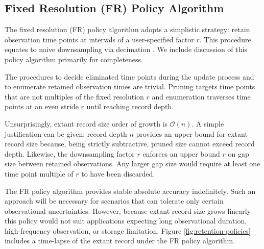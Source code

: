\subsection{Fixed Resolution (FR) Policy Algorithm}
\label{sec:fixed-resolution-algo}

The fixed resolution (FR) policy algorithm adopts a simplistic strategy: retain observation time points at intervals of a user-specified factor $r$.
This procedure equates to naive downsampling via decimation \citep[p. 31]{crochiere1983multirate}.
We include discussion of this policy algorithm primarily for completeness.

The procedures to decide eliminated time points during the update process and to enumerate retained observation times are trivial.
Pruning targets time points that are not multiples of the fixed resolution $r$ and enumeration traverses time points at an even stride $r$ until reaching record depth.

Unsurprisingly, extant record size order of growth is $\mathcal{O}(n)$.
A simple justification can be given: record depth $n$ provides an upper bound for extant record size because, being strictly subtractive, pruned size cannot exceed record depth.
Likewise, the downsampling factor $r$ enforces an upper bound $r$ on gap size between retained observations.
Any larger gap size would require at least one time point multiple of $r$ to have been discarded.
% 
% 

The FR policy algorithm provides stable absolute accuracy indefinitely.
Such an approach will be necessary for scenarios that can tolerate only certain observational uncertainties.
However, because extant record size grows linearly this policy would not suit applications expecting long observational duration, high-frequency observation, or storage limitation.
Figure \ref{fig:retention-policies} includes a time-lapse of the extant record under the FR policy algorithm.

% 
% 
